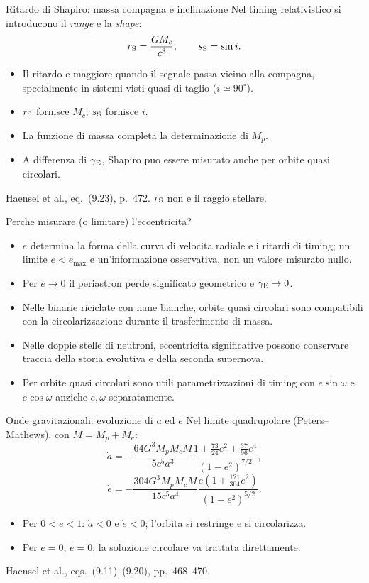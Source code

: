 \begin{frame}[t]{Ritardo di Shapiro: massa compagna e inclinazione}
\small
Nel timing relativistico si introducono il \emph{range} e la \emph{shape}:
\[
r_{\rm S}=\frac{GM_c}{c^3},\qquad s_{\rm S}=\sin i.
\]
\begin{itemize}
\item Il ritardo e maggiore quando il segnale passa vicino alla compagna, specialmente in sistemi visti quasi di taglio ($i\simeq90^\circ$).
\item $r_{\rm S}$ fornisce $M_c$; $s_{\rm S}$ fornisce $i$.
\item La funzione di massa completa la determinazione di $M_p$.
\item A differenza di $\gamma_{\rm E}$, Shapiro puo essere misurato anche per orbite quasi circolari.
\end{itemize}
\medskip\footnotesize Haensel et al., eq.~(9.23), p.~472. $r_{\rm S}$ non e il raggio stellare.
\end{frame}

\begin{frame}[t]{Perche misurare (o limitare) l'eccentricita?}
\small
\begin{itemize}
\item $e$ determina la forma della curva di velocita radiale e i ritardi di timing; un limite $e<e_{\max}$ e un'informazione osservativa, non un valore misurato nullo.
\item Per $e\to0$ il periastron perde significato geometrico e $\gamma_{\rm E}\to0$.
\item Nelle binarie riciclate con nane bianche, orbite quasi circolari sono compatibili con la circolarizzazione durante il trasferimento di massa.
\item Nelle doppie stelle di neutroni, eccentricita significative possono conservare traccia della storia evolutiva e della seconda supernova.
\item Per orbite quasi circolari sono utili parametrizzazioni di timing con $e\sin\omega$ e $e\cos\omega$ anziche $e,\omega$ separatamente.
\end{itemize}
\end{frame}

\begin{frame}[t]{Onde gravitazionali: evoluzione di $a$ ed $e$}
\small
Nel limite quadrupolare (Peters--Mathews), con $M=M_p+M_c$:
\[
\dot a=-\frac{64G^3M_pM_cM}{5c^5a^3}
\frac{1+\frac{73}{24}e^2+\frac{37}{96}e^4}{(1-e^2)^{7/2}},
\]
\[
\dot e=-\frac{304G^3M_pM_cM}{15c^5a^4}
\frac{e(1+\frac{121}{304}e^2)}{(1-e^2)^{5/2}}.
\]
\begin{itemize}
\item Per $0<e<1$: $\dot a<0$ e $\dot e<0$; l'orbita si restringe e si circolarizza.
\item Per $e=0$, $\dot e=0$; la soluzione circolare va trattata direttamente.
\end{itemize}
\medskip\footnotesize Haensel et al., eqs.~(9.11)--(9.20), pp.~468--470.
\end{frame}


